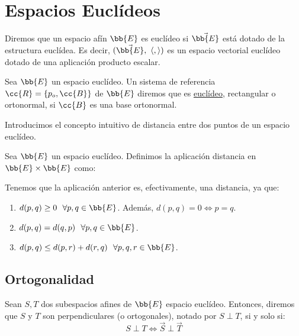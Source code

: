 \chapter{Espacios Euclídeos}

\begin{definicion}
    Diremos que un espacio afín $\bb{E}$ es euclídeo si $\vec{\bb{E}}$ está dotado de la estructura euclídea.
    Es decir, $(\vec{\bb{E}},~\langle,\rangle)$ es un espacio vectorial euclídeo dotado de una aplicación producto escalar.
\end{definicion}

\begin{definicion}
    Sea $\bb{E}$ un espacio euclídeo. Un sistema de referencia $\cc{R}=\{p_o,\cc{B}\}$ de $\bb{E}$ diremos que es
    \ul{euclídeo}, rectangular o ortonormal, si $\cc{B}$ es una base ortonormal.
\end{definicion}

Introducimos el concepto intuitivo de distancia entre dos puntos de un espacio euclídeo.
\begin{definicion}[Distancia]
    Sea $\bb{E}$ un espacio euclídeo. Definimos la aplicación distancia en $\bb{E}\times \bb{E}$ como:
\end{definicion}

Tenemos que la aplicación anterior es, efectivamente, una distancia, ya que:
\begin{enumerate}
    \item $d(p,q)\geq 0~~\forall p,q\in \bb{E}$. Además, $d(p,q)=0\Longleftrightarrow p=q$.
    \item $d(p,q)=d(q,p)~~\forall p,q\in \bb{E}$.
    \item $d(p,q)\leq d(p,r) + d(r,q)~~\forall p,q,r\in \bb{E}$.
\end{enumerate}


\section{Ortogonalidad}
\begin{definicion}
    Sean $S,T$ dos subespacios afines de $\bb{E}$ espacio euclídeo. Entonces, diremos que $S$ y $T$ son perpendiculares (o ortogonales), notado por $S\perp T$, si y solo si:
    \begin{equation*}
        S\perp T \Longleftrightarrow \vec{S}\perp \vec{T}
    \end{equation*}
\end{definicion}

